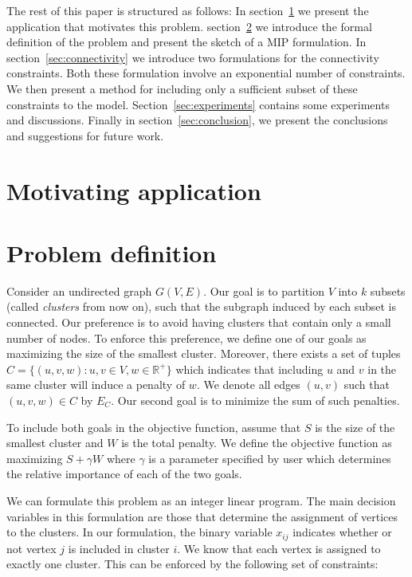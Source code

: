 \documentclass[conference,compsoc]{IEEEtran}
\begin{document}
The rest of this paper is structured as follows: In
section~\ref{sec:motivation} we present the application that motivates
this problem.  section~\ref{sec:definition} we introduce the formal
definition of the problem and present the sketch of a MIP formulation.
In section~\ref{sec:connectivity} we introduce two formulations for
the connectivity constraints. Both these formulation involve an
exponential number of constraints. We then present a method for
including only a sufficient subset of these constraints to the
model. Section~\ref{sec:experiments} contains some experiments and
discussions. Finally in section~\ref{sec:conclusion}, 
we present the conclusions and suggestions for future work.

\section{Motivating application}
\label{sec:motivation}

\section{Problem definition}
\label{sec:definition}

Consider an undirected graph $G(V, E)$. Our goal is to partition $V$
into $k$ subsets (called \emph{clusters} from now on), such that the
subgraph induced by each subset is connected. Our preference is to avoid
having clusters that contain only a small number of nodes. To enforce
this preference, we define one of our goals as maximizing the size of
the smallest cluster. Moreover, there exists a set of tuples
$C = \{(u, v, w): u, v \in V, w \in \mathbb{R}^+\}$ which indicates that
including $u$ and $v$ in the same cluster will induce a penalty of $w$. We denote all edges $(u, v)$ such that $(u, v, w) \in C$ by $E_C$. Our second goal is to minimize the sum of such penalties.

To include both goals in the objective function, assume that $S$ is the
size of the smallest cluster and $W$ is the total penalty. We define the
objective function as maximizing $S + \gamma W$ where $\gamma$ is a
parameter specified by user which determines the relative importance of
each of the two goals.

We can formulate this problem as an integer linear program. The main
decision variables in this formulation are those that determine the
assignment of vertices to the clusters. In our formulation, the binary
variable $x_{ij}$ indicates whether or not vertex $j$ is included in
cluster $i$. We know that each vertex is assigned to exactly one
cluster. This can be enforced by the following set of constraints:
\end{document}
